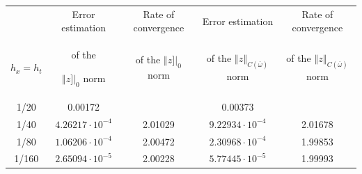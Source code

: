 \begin{table}[h!]

\renewcommand{\tabcolsep}{.75mm}

\centering 

\begin{minipage}[t]{128mm} \small \centering { \footnotesize

Погрешность и порядок сходимости в нормах $\left\Vert \cdot \right.]|_0$ и $\left\Vert \cdot \right\Vert_{C(\overline{\omega})}$



[Error estimation and rate of convergence of the $\left\Vert \cdot \right.]|_0$ and $\left\Vert \cdot \right\Vert_{C(\overline{\omega})}$ norms] } \vspace{-3mm} 

\begin{tabular}{c||c|c|c|c}

\hline 

& \footnotesize Error estimation   

& \footnotesize Rate of convergence 

& \footnotesize Error estimation   

& \footnotesize Rate of convergence \\

$h_x=h_t$ 

& \footnotesize of the 

$\left\Vert z \right.]|_0$ norm

& \footnotesize of the $\left\Vert z \right.]|_0$ norm 

& \footnotesize of the $\left\Vert z \right\Vert_{C(\overline{\omega})}$ norm

& \footnotesize of the $\left\Vert z \right\Vert_{C(\overline{\omega})}$ norm\\	

\hline\hline

1/20 &  0.00172 &  &  0.00373 & \\


1/40 &  $4.26217\cdot 10^{-4}$ &  2.01029 &   $9.22934\cdot 10^{-4}$ &  2.01678\\


1/80 & $1.06206\cdot 10^{-4}$ & 2.00472 &  $2.30968\cdot 10^{-4}$ &  1.99853\\


1/160 &  $2.65094\cdot 10^{-5}$ & 2.00228 & $5.77445\cdot 10^{-5}$ &  1.99993\\

\hline

\end{tabular}

\end{minipage}

\end{table}





